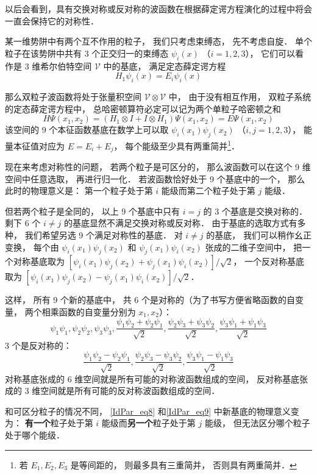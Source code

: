 以后会看到，具有交换对称或反对称的波函数在根据薛定谔方程演化的过程中将会一直会保持它的对称性． %

\begin{example}{}
某一维势阱中有两个互不作用的粒子， 我们只考虑束缚态， 先不考虑自旋． 单个粒子在该势阱中共有 3 个正交归一的束缚态 $\psi_i(x)$ （$i=1,2,3$）， 它们可以看作是 3 维希尔伯特空间 $\mathcal V$ 中的基底， 满足定态薛定谔方程
\begin{equation}
H_1 \psi_i(x) = E_i \psi_i(x)
\end{equation}

那么双粒子波函数将处于张量积空间 $\mathcal V\otimes \mathcal V$ 中， 由于没有相互作用，  双粒子系统的定态薛定谔方程中， 总哈密顿算符必定可以记为两个单粒子哈密顿之和
\begin{equation}
H\Psi(x_1, x_2) = (H_1\otimes I + I \otimes H_1)\Psi(x_1, x_2) = E \Psi(x_1, x_2)
\end{equation}
该空间的 9 个本征函数基底在数学上可以取 $\psi_i(x_1) \psi_j(x_2)$ （$i,j=1,2,3$）， 能量本征值对应为 $E = E_i + E_j$， 每个能级至少具有两重简并\footnote{若 $E_1, E_2, E_3$ 是等间距的， 则最多具有三重简并， 否则具有两重简并．}．

现在来考虑对称性的问题， 若两个粒子是可区分的， 那么波函数可以在这个 9 维空间中任意选取， 再进行归一化． 若波函数恰好处于 9 个基底中的一个， 那么此时的物理意义是： 第一个粒子处于第 $i$ 能级而第二个粒子处于第 $j$ 能级．

但若两个粒子是全同的， 以上 9 个基底中只有 $i = j$ 的 3 个基底是交换对称的． 剩下 6 个 $i\ne j$ 的基底显然不满足交换对称或反对称． 由于基底的选取方式有多种， 我们希望另选 9 个满足对称性的基底． 对 $i\ne j$ 的基底， 我们可以稍作幺正变换， 每个由 $\psi_i(x_1)\psi_j(x_2)$ 和 $\psi_j(x_1)\psi_i(x_2)$ 张成的二维子空间中， 把一个对称基底取为 $[\psi_i(x_1) \psi_j(x_2) + \psi_j(x_1) \psi_i(x_2)]/\sqrt{2}$， 一个反对称基底取为 $[\psi_i(x_1) \psi_j(x_2) - \psi_j(x_1) \psi_i(x_2)]/\sqrt{2}$．

这样， 所有 9 个新的基底中， 共 6 个是对称的（为了书写方便省略函数的自变量， 两个相乘函数的自变量分别为 $x_1, x_2$）：
\begin{equation}\label{IdPar_eq8}
\psi_1\psi_1, \psi_2\psi_2, \psi_3\psi_3,
\frac{\psi_1\psi_2+\psi_2\psi_1}{\sqrt 2},
\frac{\psi_2\psi_3+\psi_3\psi_2}{\sqrt 2},
\frac{\psi_3\psi_1+\psi_1\psi_3}{\sqrt 2}
\end{equation}
3 个是反对称的：
\begin{equation}\label{IdPar_eq9}
\frac{\psi_1\psi_2-\psi_2\psi_1}{\sqrt 2},
\frac{\psi_2\psi_3-\psi_3\psi_2}{\sqrt 2},
\frac{\psi_3\psi_1-\psi_1\psi_3}{\sqrt 2}
\end{equation}
对称基底张成的 6 维空间就是所有可能的对称波函数组成的空间， 反对称基底张成的 3 维空间就是所有可能的反对称波函数组成的空间．

和可区分粒子的情况不同， \autoref{IdPar_eq8} 和\autoref{IdPar_eq9} 中新基底的物理意义变为： \textbf{有一个}粒子处于第 $i$ 能级而\textbf{另一个}粒子处于第 $j$ 能级， 但无法区分哪个粒子处于哪个能级．
\end{example}

